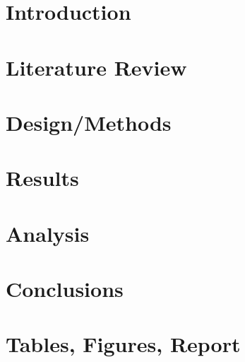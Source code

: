\documentclass[a4paper,12pt,oneside]{book}
\begin{document}
\frontmatter





\mainmatter


\chapter{Introduction}

\chapter{Literature Review}

\chapter{Design/Methods}

\chapter{Results}

\chapter{Analysis}

\chapter{Conclusions}


\backmatter



\chapter{Tables, Figures, Report}
\label{appa}

%

\printnomenclature[3cm]

\printindex
\end{document}
